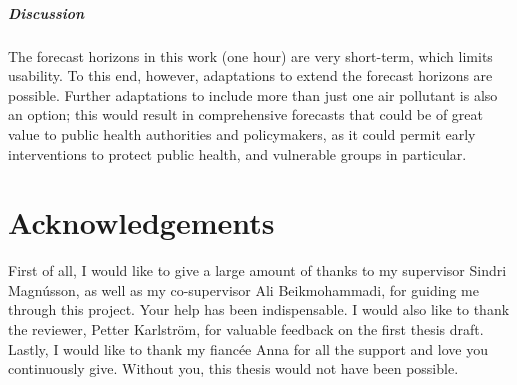 \documentclass[12pt]{report}
\numberwithin{equation}{section}
\begin{document}
\paragraph{Discussion}
The forecast horizons in this work (one hour) are very short-term, which limits usability. To this end, however, adaptations to extend the forecast horizons are possible. Further adaptations to include more than just one air pollutant is also an option; this would result in comprehensive forecasts that could be of great value to public health authorities and policymakers, as it could permit early interventions to protect public health, and vulnerable groups in particular.

\chapter*{Acknowledgements}
\thispagestyle{empty}

First of all, I would like to give a large amount of thanks to my supervisor Sindri Magnússon, as well as my co-supervisor Ali Beikmohammadi, for guiding me through this project. Your help has been indispensable. I would also like to thank the reviewer, Petter Karlström, for valuable feedback on the first thesis draft. Lastly, I would like to thank my fiancée Anna for all the support and love you continuously give. Without you, this thesis would not have been possible. 

\tableofcontents
\thispagestyle{plain}

\listoffigures
\setcounter{page}{1}
\thispagestyle{plain}

\listoftables
\thispagestyle{plain}
\end{document}
